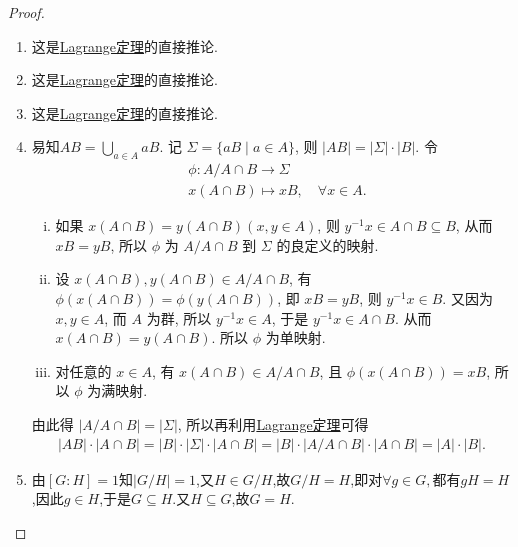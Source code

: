 \documentclass[../../main.tex]{subfiles}%
\begin{document}
\begin{proof}
\begin{enumerate}[(1)]
\item 这是\hyperref[theorem:抽象代数--Lagrange定理]{Lagrange定理}的直接推论. 

\item 这是\hyperref[theorem:抽象代数--Lagrange定理]{Lagrange定理}的直接推论. 

\item 这是\hyperref[theorem:抽象代数--Lagrange定理]{Lagrange定理}的直接推论. 

\item 易知$AB = \bigcup\limits_{a \in A} aB$. 记 $\Sigma = \{aB \mid a \in A\}$, 则 $|AB| = |\Sigma| \cdot |B|$. 令
\begin{align*}
&\phi : A/A\cap B\longrightarrow \Sigma 
\\
&x(A\cap B)\longmapsto xB,\quad \forall x\in A.
\end{align*}
\begin{enumerate}[(i)]
\item 如果 $x(A\cap B) = y(A\cap B)(x,y \in A)$, 则 $y^{-1}x \in A\cap B \subseteq B$, 从而 $xB = yB$, 所以 $\phi$ 为 $A/A\cap B$ 到 $\Sigma$ 的良定义的映射.

\item 设 $x(A\cap B),y(A\cap B) \in A/A\cap B$, 有 $\phi(x(A\cap B)) = \phi(y(A\cap B))$, 即 $xB = yB$, 则 $y^{-1}x \in B$. 又因为 $x,y \in A$, 而 $A$ 为群, 所以 $y^{-1}x \in A$, 于是 $y^{-1}x \in A\cap B$. 从而 $x(A\cap B) = y(A\cap B)$. 所以 $\phi$ 为单映射.

\item 对任意的 $x \in A$, 有 $x(A\cap B) \in A/A\cap B$, 且 $\phi(x(A\cap B)) = xB$, 所以 $\phi$ 为满映射.
\end{enumerate}
由此得 $|A/A\cap B| = |\Sigma|$, 所以再利用\hyperref[theorem:抽象代数--Lagrange定理]{Lagrange定理}可得
\begin{align*}
|AB| \cdot |A\cap B| = |B| \cdot |\Sigma| \cdot |A\cap B| = |B| \cdot |A/A\cap B| \cdot |A\cap B| = |A| \cdot |B|.
\end{align*}

\item 由$[G:H]=1$知$|G/H|=1$,又$H\in G/H$,故$G/H=H$,即对$\forall g\in G,$都有$gH = H$,因此$g\in H$,于是$G\subseteq H$.又$H\subseteq G$,故$G=H$.
\end{enumerate}


\end{proof}
\end{document}
